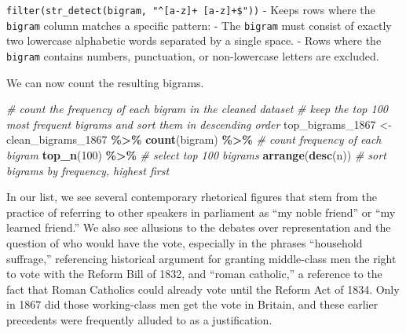 \documentclass[
]{article}
\newenvironment{Shaded}{\begin{snugshade}}{\end{snugshade}}
\newcommand{\CommentTok}[1]{\textcolor[rgb]{0.56,0.35,0.01}{\textit{#1}}}
\newcommand{\DecValTok}[1]{\textcolor[rgb]{0.00,0.00,0.81}{#1}}
\newcommand{\FunctionTok}[1]{\textcolor[rgb]{0.13,0.29,0.53}{\textbf{#1}}}
\newcommand{\NormalTok}[1]{#1}
\newcommand{\OtherTok}[1]{\textcolor[rgb]{0.56,0.35,0.01}{#1}}
\newcommand{\SpecialCharTok}[1]{\textcolor[rgb]{0.81,0.36,0.00}{\textbf{#1}}}
\begin{document}
\texttt{filter(str\_detect(bigram,\ "\^{}{[}a-z{]}+\ {[}a-z{]}+\$"))} -
Keeps rows where the \texttt{bigram} column matches a specific pattern:
- The \texttt{bigram} must consist of exactly two lowercase alphabetic
words separated by a single space. - Rows where the \texttt{bigram}
contains numbers, punctuation, or non-lowercase letters are excluded.

We can now count the resulting bigrams.

\begin{Shaded}
\begin{Highlighting}[]
\CommentTok{\# count the frequency of each bigram in the cleaned dataset}
\CommentTok{\# keep the top 100 most frequent bigrams and sort them in descending order}
\NormalTok{top\_bigrams\_1867 }\OtherTok{\textless{}{-}}\NormalTok{ clean\_bigrams\_1867 }\SpecialCharTok{\%\textgreater{}\%}
  \FunctionTok{count}\NormalTok{(bigram) }\SpecialCharTok{\%\textgreater{}\%} \CommentTok{\# count frequency of each bigram}
  \FunctionTok{top\_n}\NormalTok{(}\DecValTok{100}\NormalTok{) }\SpecialCharTok{\%\textgreater{}\%} \CommentTok{\# select top 100 bigrams}
  \FunctionTok{arrange}\NormalTok{(}\FunctionTok{desc}\NormalTok{(n)) }\CommentTok{\# sort bigrams by frequency, highest first}
\end{Highlighting}
\end{Shaded}

\begin{table}
\centering
\caption{\label{tab:unnamed-chunk-17}The most frequent bigrams in the 1867 Hansard corpus, ranked 
    by their number of occurrences.}
\centering
{}
\end{table}

In our list, we see several contemporary rhetorical figures that stem
from the practice of referring to other speakers in parliament as ``my
noble friend'' or ``my learned friend.'' We also see allusions to the
debates over representation and the question of who would have the vote,
especially in the phrases ``household suffrage,'' referencing historical
argument for granting middle-class men the right to vote with the Reform
Bill of 1832, and ``roman catholic,'' a reference to the fact that Roman
Catholics could already vote until the Reform Act of 1834. Only in 1867
did those working-class men get the vote in Britain, and these earlier
precedents were frequently alluded to as a justification.
\end{document}
